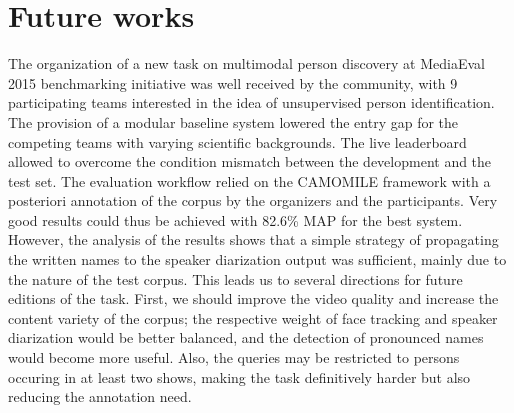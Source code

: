 \section{Future works}
\label{sec:discuss}

The organization of a new task on multimodal person discovery at MediaEval 2015 benchmarking initiative was well received by the community, with 9 participating teams interested in the idea of unsupervised person identification.
The provision of a modular baseline system lowered the entry gap for the competing teams with varying scientific backgrounds. The live leaderboard allowed to overcome the condition mismatch between the development and the test
set. The evaluation workflow relied on the CAMOMILE framework with a posteriori annotation of the corpus by the
organizers and the participants. Very good results could thus be achieved with 82.6\% MAP for the best system. However,
the analysis of the results shows that a simple strategy of propagating the written names to the speaker diarization output
was sufficient, mainly due to the nature of the test corpus. This leads us to several directions for future editions of the
task. First, we should improve the video quality and increase the content variety of the corpus; the respective weight of face
tracking and speaker diarization would be better balanced, and the detection of pronounced names would become more useful.
Also, the queries may be restricted to persons occuring in at least two shows, making the task definitively harder but also reducing the annotation need.

\endinput
